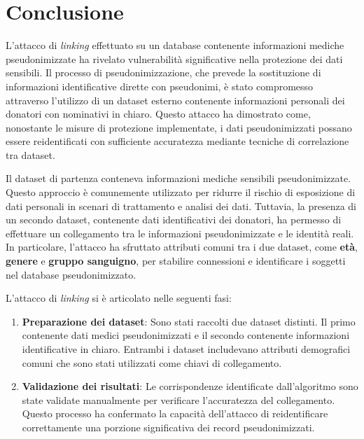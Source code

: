 \chapter*{Conclusione} %

L'attacco di \textit{linking} effettuato su un database contenente informazioni mediche pseudonimizzate ha rivelato vulnerabilità significative nella protezione dei dati sensibili. Il processo di pseudonimizzazione, che prevede la sostituzione di informazioni identificative dirette con pseudonimi, è stato compromesso attraverso l'utilizzo di un dataset esterno contenente informazioni personali dei donatori con nominativi in chiaro. Questo attacco ha dimostrato come, nonostante le misure di protezione implementate, i dati pseudonimizzati possano essere reidentificati con sufficiente accuratezza mediante tecniche di correlazione tra dataset.

Il dataset di partenza conteneva informazioni mediche sensibili pseudonimizzate. Questo approccio è comunemente utilizzato per ridurre il rischio di esposizione di dati personali in scenari di trattamento e analisi dei dati. Tuttavia, la presenza di un secondo dataset, contenente dati identificativi dei donatori, ha permesso di effettuare un collegamento tra le informazioni pseudonimizzate e le identità reali. In particolare, l'attacco ha sfruttato attributi comuni tra i due dataset, come \textbf{età}, \textbf{genere} e \textbf{gruppo sanguigno}, per stabilire connessioni e identificare i soggetti nel database pseudonimizzato.

L'attacco di \textit{linking} si è articolato nelle seguenti fasi:

\begin{enumerate}
    \item \textbf{Preparazione dei dataset}: Sono stati raccolti due dataset distinti. Il primo contenente dati medici pseudonimizzati e il secondo contenente informazioni identificative in chiaro. Entrambi i dataset includevano attributi demografici comuni che sono stati utilizzati come chiavi di collegamento.
    \item \textbf{Validazione dei risultati}: Le corrispondenze identificate dall'algoritmo sono state validate manualmente per verificare l'accuratezza del collegamento. Questo processo ha confermato la capacità dell'attacco di reidentificare correttamente una porzione significativa dei record pseudonimizzati.
\end{enumerate}

